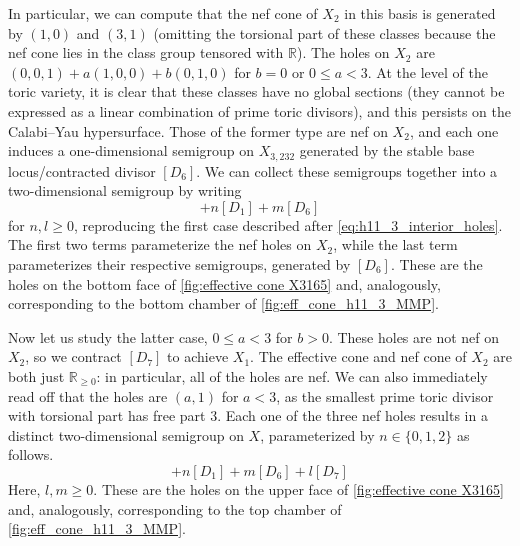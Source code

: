 \documentclass[11pt,dvipsnames]{article}
\theoremstyle{definition}
\begin{document}
In particular, we can compute that the nef cone of $X_2$ in this basis is generated by $(1,0)$ and $(3,1)$ (omitting the torsional part of these classes because the nef cone lies in the class group tensored with $\mathbb{R}$). The holes on $X_2$ are $(0,0,1) + a(1,0,0) + b(0,1,0)$ for $b = 0$ or $0 \leq a < 3$. At the level of the toric variety, it is clear that these classes have no global sections (they cannot be expressed as a linear combination of prime toric divisors), and this persists on the Calabi--Yau hypersurface. Those of the former type are nef on $X_2$, and each one induces a one-dimensional semigroup on $X_{3,232}$ generated by the stable base locus/contracted divisor $[D_6]$. We can collect these semigroups together into a two-dimensional semigroup by writing
\begin{equation}
    [D] + n[D_1] + m[D_6]
\end{equation}
for $n, l \geq 0$, reproducing the first case described after \cref{eq:h11_3_interior_holes}. The first two terms parameterize the nef holes on $X_2$, while the last term parameterizes their respective semigroups, generated by $[D_6]$. These are the holes on the bottom face of \cref{fig:effective cone X3165} and, analogously, corresponding to the bottom chamber of \cref{fig:eff_cone_h11_3_MMP}.

Now let us study the latter case, $0 \leq a < 3$ for $b > 0$. These holes are not nef on $X_2$, so we contract $[D_7]$ to achieve $X_1$. The effective cone and nef cone of $X_2$ are both just $\mathbb{R}_{\geq 0}$: in particular, all of the holes are nef. We can also immediately read off that the holes are $(a,1)$ for $a < 3$, as the smallest prime toric divisor with torsional part has free part $3$. Each one of the three nef holes results in a distinct two-dimensional semigroup on $X$, parameterized by $n \in \{0, 1, 2\}$ as follows.
\begin{equation}
    [D] + n[D_1] + m[D_6] + l[D_7]
\end{equation}
Here, $l, m \geq 0$. These are the holes on the upper face of \cref{fig:effective cone X3165} and, analogously, corresponding to the top chamber of \cref{fig:eff_cone_h11_3_MMP}.
\end{document}

